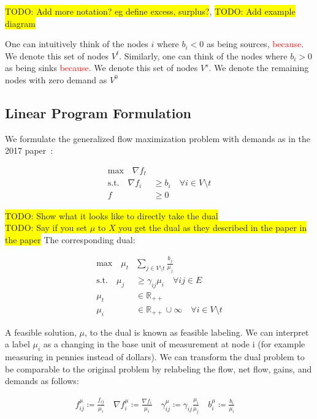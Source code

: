 \documentclass[12pt]{article}
\theoremstyle{definition}
\newcommand{\R}{\mathbb{R}}
\newcommand{\vsrc}{V^{t}}
\newcommand{\vsink}{V^{s}}
\newcommand{\vz}{V^{0}}
\newcommand{\rewrite}[1]{\textcolor{red}{#1}}
\newcommand{\todo}[1]{\colorbox{yellow}{TODO: #1}}
\begin{document}
\todo{Add more notation? eg define excess, surplus?}, \todo{Add example diagram}

One can intuitively think of the nodes $i$ where $b_i < 0$ as being sources, \rewrite{because}. We denote this set of nodes $\vsrc$. Similarly, one can think of the nodes where $b_i > 0$ as being sinks \rewrite{because}. We denote this set of nodes $\vsink$. We denote the remaining nodes with zero demand as $\vz$
    
    \subsection{Linear Program Formulation}
    \label{sec:lp}

	We formulate the generalized flow maximization problem with demands as in the 2017 paper~\cite{Olver2017}:
    
        \begin{align*}\tag{P}
        \text{max} \quad
        \nabla f_t& \\
        \text{s.t.} \quad
        \nabla f_i &\geq b_i \quad \forall i \in V \setminus t \\
        f &\geq 0
        \end{align*}        

\todo{Show what it looks like to directly take the dual}\\
\todo{Say if you set $\mu$ to $X$ you get the dual as they described in the paper in the paper}
\noindent The corresponding dual:
 
        \begin{align*}\tag{D}
        \text{max} \quad
        \mu_t &\sum_{j \in V \setminus t} \frac{b_j}{\mu_j}  \\
        \text{s.t.} \quad
        \mu_j &\geq \gamma_{ij}\mu_i \quad \forall ij \in E \\
        \mu_t &\in \R_{++} \\
        \mu_i &\in \R_{++} \cup \infty \quad \forall i \in V \setminus t
        \end{align*}  
        
A feasible solution, $\mu$, to the dual is known as feasible labeling. We can interpret a label $\mu_i$ as a changing in the base unit of measurement  at node i (for example measuring in pennies instead of dollars). We can transform the dual problem to be comparable to the original problem by relabeling the flow, net flow, gains, and demands as follows:

\begin{align*}
f_{ij}^\mu \coloneqq \frac{f_{ij}}{\mu_i} \quad
\nabla f_i^\mu \coloneqq \frac{\nabla f_i }{\mu_i} \quad
\gamma_{ij}^\mu \coloneqq \gamma_{ij} \frac{\mu_i}{\mu_j} \quad
b_i^\mu \coloneqq \frac{b_i}{\mu_i} \quad
\end{align*}
\end{document}
